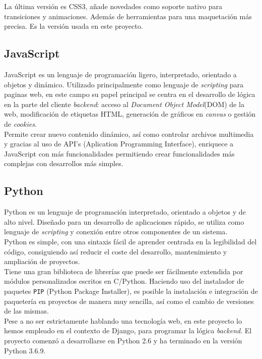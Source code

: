 \documentclass[a4paper, 12pt]{book}
\begin{document}
		La última versión es CSS3, añade novedades como soporte nativo para transiciones y animaciones. Además de herramientas para una maquetación más precisa. Es la versión usada en este proyecto.
		
	\subsection{JavaScript}
	\label{subsec:javascript}
		JavaScript \cite{JavaScript} es un lenguaje de programación ligero, interpretado, orientado a objetos y dinámico. Utilizado principalmente como lenguaje de \textit{scripting} para paginas web, en este campo su papel principal se centra en el desarrollo de lógica en la parte del cliente \textit{backend}: acceso al \textit{Document Object Model}(DOM) de la web, modificación de etiquetas HTML, generación de gráficos en \textit{canvas} o gestión de \textit{cookies}. \\
		
		Permite crear nuevo contenido dinámico, así como controlar archivos multimedia y gracias al uso de API's (Aplication Programming Interface), enriquece a JavaScript con más funcionalidades permitiendo crear funcionalidades más complejas con desarrollos más simples.
		
	\subsection{Python}
	\label{subsec:python}
		Python es un lenguaje de programación interpretado, orientado a objetos y de alto nivel. Diseñado para un desarrollo de aplicaciones rápido, se utiliza como lenguaje de \textit{scripting} y conexión entre otros componentes de un sistema.\\
		
		Python es simple, con una sintaxis fácil de aprender centrada en la legibilidad del código, consiguiendo así reducir el coste del desarrollo, mantenimiento y ampliación de proyectos.\\
		
		Tiene una gran biblioteca de librerías que puede ser fácilmente extendida por módulos personalizados escritos en C/Python. Haciendo uso del instalador de paquetes \texttt{PIP} (Python Package Installer), es posible la instalación e integración de paquetería en proyectos de manera muy sencilla, así como el cambio de versiones de las mismas.\\
		
		Pese a no ser estrictamente hablando una tecnología web, en este proyecto lo hemos empleado en el contexto de Django, para programar la lógica \textit{backend}. El proyecto comenzó a desarrollarse en Python 2.6 y ha terminado en la versión Python 3.6.9.
		
\end{document}
